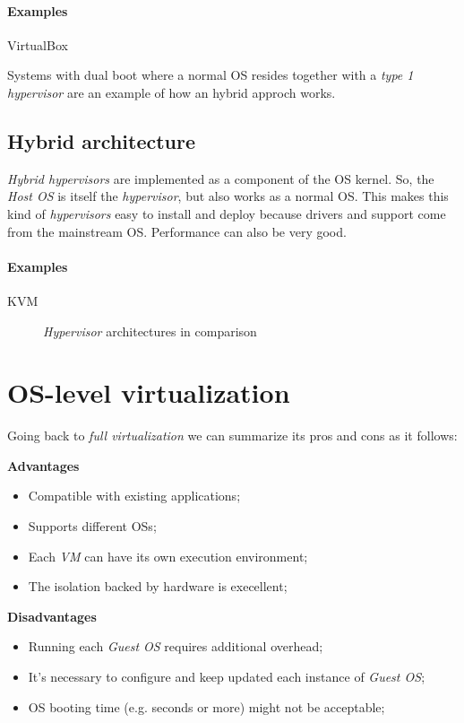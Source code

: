 \paragraph{Examples} VirtualBox

\begin{note}
    Systems with dual boot where a normal OS resides together with a \emph{type
    1 hypervisor} are an example of how an hybrid approch works.
\end{note}

\subsection{Hybrid architecture}
\emph{Hybrid hypervisors} are implemented as a component of the OS kernel.
So, the \emph{Host OS} is itself the \emph{hypervisor}, but also works as a
normal OS. This makes this kind of \emph{hypervisors} easy to install and deploy
because drivers and support come from the mainstream OS. Performance can also
be very good.

\paragraph{Examples} KVM

\begin{figure}[hb!]
    \centering
    \caption{\emph{Hypervisor} architectures in comparison}
\end{figure}

\section{OS-level virtualization}
Going back to \emph{full virtualization} we can summarize its pros and cons as
it follows:

\bigskip\noindent
\begin{minipage}[t]{0.48\textwidth}
    \textbf{Advantages}
    \begin{itemize}
        \item Compatible with existing applications;
        \item Supports different OSs;
        \item Each \emph{VM} can have its own execution environment;
        \item The isolation backed by hardware is execellent;
    \end{itemize}
\end{minipage}
\hfill
\begin{minipage}[t]{0.48\textwidth}
    \textbf{Disadvantages}
    \begin{itemize}
        \item Running each \emph{Guest OS} requires additional overhead;
        \item It's necessary to configure and keep updated each instance of
        \emph{Guest OS};
        \item OS booting time (e.g. seconds or more) might not be acceptable;
    \end{itemize}
\end{minipage}

